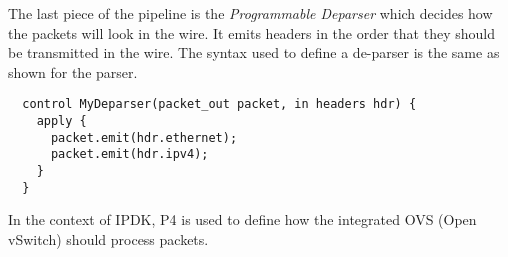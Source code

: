 \documentclass[../sn.tex]{subfiles}
\begin{document}
The last piece of the pipeline is the \emph{Programmable Deparser} which decides how the packets will look in the wire.
It emits headers in the order that they should be transmitted in the wire.
The syntax used to define a de-parser is the same as shown for the parser.
\begin{lstlisting}
  control MyDeparser(packet_out packet, in headers hdr) {
    apply {
      packet.emit(hdr.ethernet);
      packet.emit(hdr.ipv4);
    }
  }
\end{lstlisting}
In the context of IPDK, P4 is used to define how the integrated OVS (Open vSwitch) should process packets. 
\end{document}
